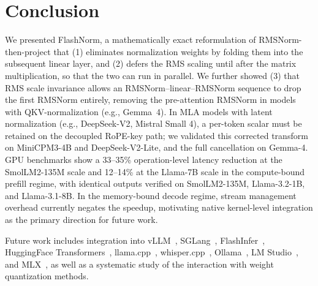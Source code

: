\documentclass{article}
\begin{document}
\section{Conclusion}
We presented FlashNorm, a mathematically exact reformulation of RMSNorm-then-project
that (1) eliminates normalization weights by folding them into the subsequent linear
layer, and (2) defers the RMS scaling until after the matrix multiplication,
so that the two can run in parallel.
We further showed (3) that RMS scale invariance allows an RMSNorm--linear--RMSNorm sequence
to drop the first RMSNorm entirely,
removing the pre-attention RMSNorm in models with QKV-normalization (e.g., Gemma~4).
In MLA models with latent normalization (e.g., DeepSeek-V2, Mistral Small 4), a per-token
scalar must be retained on the decoupled RoPE-key path; we validated this corrected
transform on MiniCPM3-4B and DeepSeek-V2-Lite, and the full cancellation on Gemma-4.
GPU benchmarks show a 33--35\% operation-level latency reduction at
the SmolLM2-135M scale and 12--14\% at the Llama-7B scale
in the compute-bound prefill regime, with identical outputs verified on
SmolLM2-135M, Llama-3.2-1B, and Llama-3.1-8B.
In the memory-bound decode regime, stream management overhead
currently negates the speedup, motivating native kernel-level integration as the
primary direction for future work.

Future work includes integration into
vLLM~\citep{vLLM}, SGLang~\citep{sglang}, FlashInfer~\citep{flashInfer},
HuggingFace Transformers~\citep{HFtransformers},
llama.cpp~\citep{llama-cpp}, whisper.cpp~\citep{whisper-cpp},
Ollama~\citep{ollama}, LM Studio~\citep{lmstudio}, and MLX~\citep{mlx}, as well as a systematic
study of the interaction with weight quantization methods.

\end{document}
